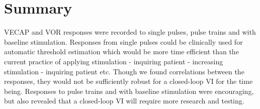 \section{Summary}
VECAP and VOR responses were recorded to single pulses, pulse trains and with baseline stimulation. Responses from single pulses could be clinically used for automatic threshold estimation which would be more time efficient than the current practice of applying stimulation - inquiring patient - increasing stimulation - inquiring patient etc.  Though we found correlations between the responses, they would not be sufficiently robust for a closed-loop VI for the time being. Responses to pulse trains and with baseline stimulation were encouraging, but also revealed that a closed-loop VI will require  more research and testing.